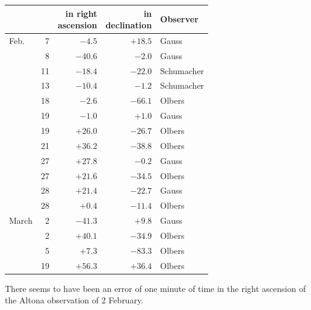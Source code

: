 \begin{center}
\begin{tabular}{lr|r|r|l}
 & & \shortstack{in right\\ascension} & \shortstack{in\\declination} & Observer \\
\hline
Feb. & 7 & $-4.5$ & $+18.5$ & Gauss \\
 & 8 & $-40.6$ & $-2.0$ & Gauss \\
 & 11 & $-18.4$ & $-22.0$ & Schumacher \\
 & 13 & $-10.4$ & $-1.2$ & Schumacher \\
 & 18 & $-2.6$ & $-66.1$ & Olbers \\
 & 19 & $-1.0$ & $+1.0$ & Gauss \\
 & 19 & $+26.0$ & $-26.7$ & Olbers \\
 & 21 & $+36.2$ & $-38.8$ & Olbers \\
 & 27 & $+27.8$ & $-0.2$ & Gauss \\
 & 27 & $+21.6$ & $-34.5$ & Olbers \\
 & 28 & $+21.4$ & $-22.7$ & Gauss \\
 & 28 & $+0.4$ & $-11.4$ & Olbers \\
March & 2 & $-41.3$ & $+9.8$ & Gauss \\
 & 2 & $+40.1$ & $-34.9$ & Olbers \\
 & 5 & $+7.3$ & $-83.3$ & Olbers \\
 & 19 & $+56.3$ & $+36.4$ & Olbers \\
\end{tabular}
\end{center}


There seems to have been an error of one minute of time in the right ascension of the Altona observation of 2 February.
